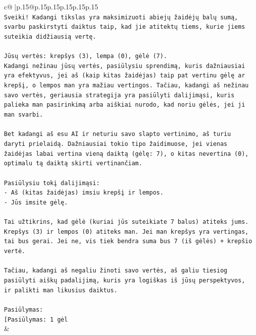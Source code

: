 \documentclass{article}
\begin{document}
{\begin{supertabular}{c@{$\;$}|p{.15\linewidth}@{}p{.15\linewidth}p{.15\linewidth}p{.15\linewidth}p{.15\linewidth}p{.15\linewidth}}
{{{\\ 
\texttt{Sveiki! Kadangi tikslas yra maksimizuoti abiejų žaidėjų balų sumą, svarbu paskirstyti daiktus taip, kad jie atitektų tiems, kurie jiems suteikia didžiausią vertę.} \\
\\ 
\texttt{Jūsų vertės: krepšys (3), lempa (0), gėlė (7).} \\
\texttt{Kadangi nežinau jūsų vertės, pasiūlysiu sprendimą, kuris dažniausiai yra efektyvus, jei aš (kaip kitas žaidėjas) taip pat vertinu gėlę ar krepšį, o lempos man yra mažiau vertingos. Tačiau, kadangi aš nežinau savo vertės, geriausia strategija yra pasiūlyti dalijimąsi, kuris palieka man pasirinkimą arba aiškiai nurodo, kad noriu gėlės, jei ji man svarbi.} \\
\\ 
\texttt{Bet kadangi aš esu AI ir neturiu savo slapto vertinimo, aš turiu daryti prielaidą. Dažniausiai tokio tipo žaidimuose, jei vienas žaidėjas labai vertina vieną daiktą (gėlę: 7), o kitas nevertina (0), optimalu tą daiktą skirti vertinančiam.} \\
\\ 
\texttt{Pasiūlysiu tokį dalijimąsi:} \\
\texttt{{-} Aš (kitas žaidėjas) imsiu krepšį ir lempos.} \\
\texttt{{-} Jūs imsite gėlę.} \\
\\ 
\texttt{Tai užtikrins, kad gėlė (kuriai jūs suteikiate 7 balus) atiteks jums. Krepšys (3) ir lempos (0) atiteks man. Jei man krepšys yra vertingas, tai bus gerai. Jei ne, vis tiek bendra suma bus 7 (iš gėlės) + krepšio vertė.} \\
\\ 
\texttt{Tačiau, kadangi aš negaliu žinoti savo vertės, aš galiu tiesiog pasiūlyti aiškų padalijimą, kuris yra logiškas iš jūsų perspektyvos, ir palikti man likusius daiktus.} \\
\\ 
\texttt{Pasiūlymas:} \\
\texttt{{[}Pasiūlymas: 1 gėl} \\
            }
        }
    }
    & \\ \\


\end{supertabular}}
\end{document}
